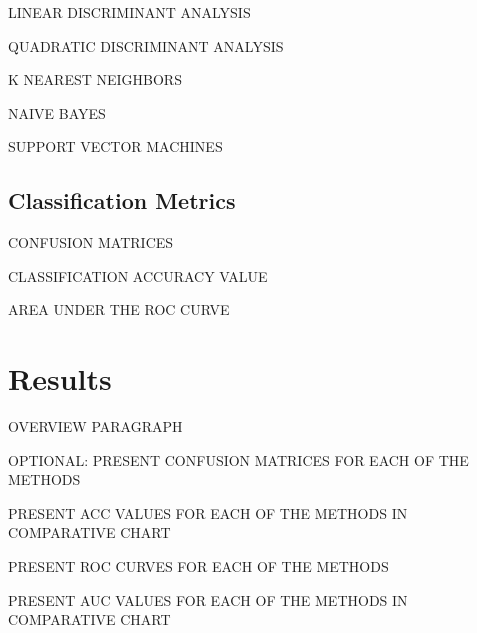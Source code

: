 \documentclass[12pt]{article}
\begin{document}
LINEAR DISCRIMINANT ANALYSIS

QUADRATIC DISCRIMINANT ANALYSIS 

K NEAREST NEIGHBORS

NAIVE BAYES

SUPPORT VECTOR MACHINES

\subsection{Classification Metrics}
\label{sec:metr}

CONFUSION MATRICES

CLASSIFICATION ACCURACY VALUE

AREA UNDER THE ROC CURVE




\section{Results}
\label{sec:resu}

OVERVIEW PARAGRAPH

OPTIONAL: PRESENT CONFUSION MATRICES FOR EACH OF THE METHODS

PRESENT ACC VALUES FOR EACH OF THE METHODS IN COMPARATIVE CHART

PRESENT ROC CURVES FOR EACH OF THE METHODS

PRESENT AUC VALUES FOR EACH OF THE METHODS IN COMPARATIVE CHART


\end{document}
